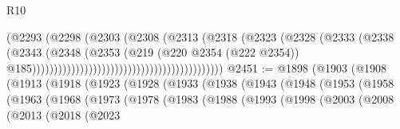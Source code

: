 \begin{lexlean}{R10}
\begin{coremodule}
{{{{{{{{{{{{{{{{{{{{{{{{{{{{{{{{{{{{{{{{{{{{{{{{{{{{{{{{{{{{{{{{{{{{{{{{{{{{{{{{{{{{{{{{{{{{{{{{{{{{{{{{{{{{                                                                (@2293
                                                                  (@2298
                                                                    (@2303
                                                                      (@2308
                                                                        (@2313
                                                                          (@2318
                                                                            (@2323
                                                                              (@2328
                                                                                (@2333
                                                                                  (@2338
                                                                                    (@2343
                                                                                      (@2348
                                                                                        (@2353
                                                                                          (@219
                                                                                            (@220
                                                                                              @2354
                                                                                              (@222
                                                                                                @2354))
                                                                                            @185))))))))))))))))))))))))))))))))))))))))))))
@2451 := @1898
    (@1903
      (@1908
        (@1913
          (@1918
            (@1923
              (@1928
                (@1933
                  (@1938
                    (@1943
                      (@1948
                        (@1953
                          (@1958
                            (@1963
                              (@1968
                                (@1973
                                  (@1978
                                    (@1983
                                      (@1988
                                        (@1993
                                          (@1998
                                            (@2003
                                              (@2008
                                                (@2013
                                                  (@2018
                                                    (@2023
}}}}}}}}}}}}}}}}}}}}}}}}}}}}}}}}}}}}}}}}}}}}}}}}}}}}}}}}}}}}}}}}}}}}}}}}}}}}}}}}}}}}}}}}}}}}}}}}}}}}}}}}}}}}
\end{coremodule}
\end{lexlean}
